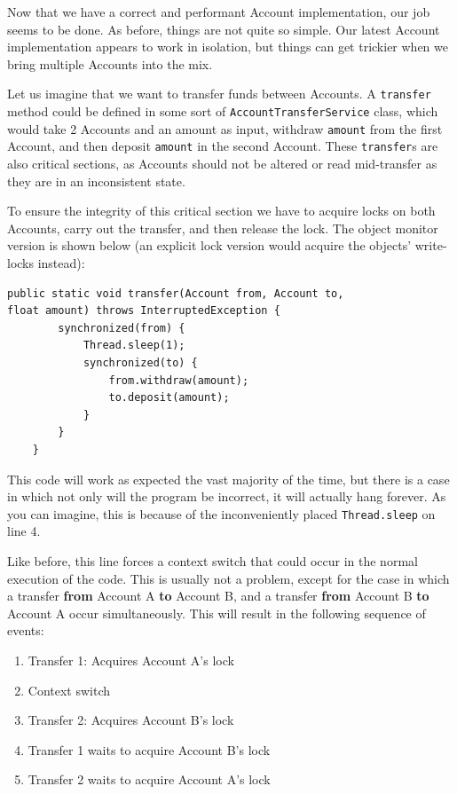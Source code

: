 \documentclass[a4paper,12pt]{kth-mag}
\begin{document}
Now that we have a correct and performant Account implementation, our job seems to be done. As before, things are not quite so simple. Our latest Account implementation appears to work in isolation, but things can get trickier when we bring multiple Accounts into the mix.

Let us imagine that we want to transfer funds between Accounts. A \texttt{transfer} method could be defined in some sort of \texttt{AccountTransferService} class, which would take 2 Accounts and an amount as input, withdraw \texttt{amount} from the first Account, and then deposit \texttt{amount} in the second Account. These \texttt{transfer}s are also critical sections, as Accounts should not be altered or read mid-transfer as they are in an inconsistent state.

To ensure the integrity of this critical section we have to acquire locks on both Accounts, carry out the transfer, and then release the lock. The object monitor version is shown below (an explicit lock version would acquire the objects' write-locks instead):

\begin{listing}[H]
	\begin{verbatim}
public static void transfer(Account from, Account to,
float amount) throws InterruptedException {
        synchronized(from) {
            Thread.sleep(1);
            synchronized(to) {
                from.withdraw(amount);
                to.deposit(amount);
            }
        }
    }
	\end{verbatim}
\end{listing}

This code will work as expected the vast majority of the time, but there is a case in which not only will the program be incorrect, it will actually hang forever. As you can imagine, this is because of the inconveniently placed \texttt{Thread.sleep} on line 4. 

Like before, this line forces a context switch that could occur in the normal execution of the code. This is usually not a problem, except for the case in which a transfer \textbf{from} Account A \textbf{to} Account B, and a transfer \textbf{from} Account B \textbf{to} Account A occur simultaneously. This will result in the following sequence of events:

\begin{enumerate}
\item Transfer 1: Acquires Account A's lock
\item Context switch
\item Transfer 2: Acquires Account B's lock
\item Transfer 1 waits to acquire Account B's lock
\item Transfer 2 waits to acquire Account A's lock
\end{enumerate}
\end{document}
